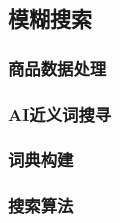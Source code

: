 \subsection{模糊搜索}



\subsubsection{商品数据处理}

\subsubsection{AI近义词搜寻}

\subsubsection{词典构建}

\subsubsection{搜索算法}